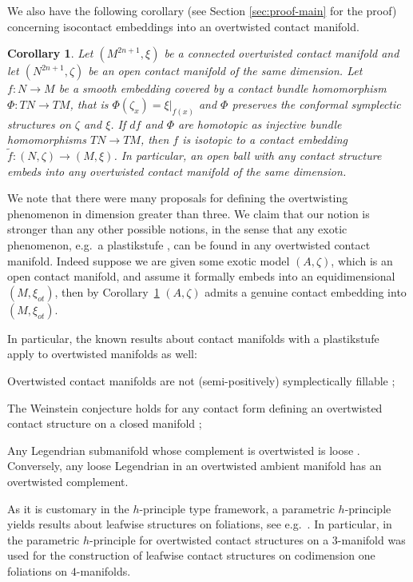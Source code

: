 \documentclass[12pt]{paper}
\theoremstyle{plain}
\newtheorem{cor}[theorem]{Corollary}
\theoremstyle{definition}
\newcommand{\wt}{\widetilde}
\numberwithin{figure}{section}
\begin{document}
  We also have the following corollary (see Section \ref{sec:proof-main} for the proof) concerning isocontact embeddings into an overtwisted contact manifold.
\begin{cor}\label{cor:isocontact}
  Let  $(M^{2n+1},\xi)$ be a connected overtwisted contact manifold and 
  let $(N^{2n+1},\zeta)$ be an open contact manifold of the same dimension.
 Let $f:N\to M$ be a smooth embedding covered by a   contact bundle homomorphism $\Phi:TN\to TM$, that is $\Phi(\zeta_x) = \xi|_{f(x)}$ and $\Phi$ preserves the conformal symplectic structures on $\zeta$ and $\xi$.  If $df$ and $\Phi$ are homotopic as injective bundle homomorphisms $TN\to TM$, then $f$ is isotopic to a contact embedding $\wt f:(N,\zeta)\to (M,\xi)$.  In particular, an open ball with any contact structure embeds into any overtwisted contact manifold of the same dimension.
\end{cor}
 
We note that there were many proposals for defining the overtwisting phenomenon in dimension greater than three.
We claim that our notion is stronger than any other possible notions, in the sense that any exotic phenomenon, e.g.\ a plastikstufe \cite{Ni06}, can be found in any overtwisted contact manifold.
Indeed suppose we are given some exotic model $(A, \zeta)$, which is an open  contact manifold, and assume it formally embeds into an equidimensional $(M, \xi_{ot})$, then by Corollary~\ref{cor:isocontact}  $(A, \zeta)$ admits a genuine   contact
embedding into $(M, \xi_{ot})$.
 

In particular, the known results about contact manifolds with a plastikstufe apply to overtwisted manifolds as well:
\begin{itemize}{\em
\item Overtwisted contact manifolds are not (semi-positively) symplectically fillable \cite{Ni06};
\item The Weinstein conjecture holds for any contact form defining an overtwisted contact structure on a closed manifold
\cite{AlHo09};
\item Any Legendrian submanifold whose complement is overtwisted is loose
 \cite{MuNiPlaSti12}. Conversely, any loose Legendrian in an overtwisted ambient manifold has  an overtwisted complement.}
\end{itemize}
   
     As it is customary in the $h$-principle type framework, a parametric $h$-principle yields results about leafwise structures on foliations,  see e.g.\ \cite{Gro69}. In  particular, in \cite{CPP14} the  parametric $h$-principle \cite{Eli89} for overtwisted contact structures on a $3$-manifold  was used for the construction of leafwise contact structures on  codimension one foliations on $4$-manifolds.
   
\end{document}

